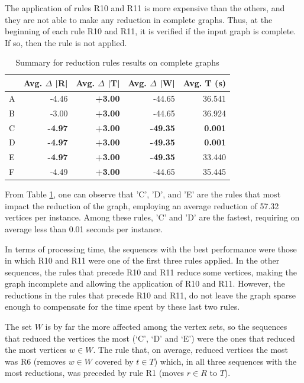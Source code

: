 \documentclass{singlecol-new}
\theoremstyle{TH}{
\newtheorem{lemma}{Lemma}
\newtheorem{theorem}[lemma]{Theorem}
\newtheorem{corrolary}[lemma]{Corrolary}
\newtheorem{conjecture}[lemma]{Conjecture}
\newtheorem{proposition}[lemma]{Proposition}
\newtheorem{claim}[lemma]{Claim}
\newtheorem{stheorem}[lemma]{Wrong Theorem}
}
\theoremstyle{THrm}{
\newtheorem{definition}{Definition}[section]
\newtheorem{question}{Question}[section]
\newtheorem{remark}{Remark}
\newtheorem{scheme}{Scheme}
}
\theoremstyle{THhit}{
\newtheorem{case}{Case}[section]
}
\begin{document}
The application of rules R10 and R11 is more expensive than the others, and they are not able to make any reduction in complete graphs. Thus, at the beginning of each rule R10 and R11, it is verified if the input graph is complete. If so, then the rule is not applied. 


\begin{table}[!h]
	\centering
	\caption{Summary for reduction rules results on complete graphs}
	\label{tab:sum-rr-complete}
	{\footnotesize
	\begin{tabular}{lrrrr}
		\hline
		 & Avg. $\Delta$ |R|     & Avg. $\Delta$ |T|     & Avg. $\Delta$ |W|      & Avg. T (s)     \\
		\hline
		A        & -4.46          & \textbf{+3.00} & -44.65          & 36.541         \\
		B        & -3.00          & \textbf{+3.00} & -44.65          & 36.924         \\
		C        & \textbf{-4.97} & \textbf{+3.00} & \textbf{-49.35} & \textbf{0.001} \\
		D        & \textbf{-4.97} & \textbf{+3.00} & \textbf{-49.35} & \textbf{0.001} \\
		E        & \textbf{-4.97} & \textbf{+3.00} & \textbf{-49.35} & 33.440         \\
		F        & -4.49          & \textbf{+3.00} & -44.65          & 35.445       \\
		\hline 
	\end{tabular}
}
\end{table}

From Table \ref{tab:sum-rr-complete}, one can observe that 'C', 'D', and 'E' are the rules that most impact the reduction of the graph, employing an average reduction of 57.32 vertices per instance. Among these rules, 'C' and 'D' are the fastest, requiring on average less than 0.01 seconds per instance.

In terms of processing time, the sequences with the best performance were those in which R10 and R11 were one of the first three rules applied. In the other sequences, the rules that precede R10 and R11 reduce some vertices, making the graph incomplete and allowing the application of R10 and R11. However, the reductions in the rules that precede R10 and R11, do not leave the graph sparse enough to compensate for the time spent by these last two rules.

The set $ W $ is by far the more affected among the vertex sets, so the sequences that reduced the vertices the most (`C', `D' and `E') were the ones that reduced the most vertices $ w \in W $. The rule that, on average, reduced vertices the most was R6 (removes $ w \in W $ covered by $ t \in T $) which, in all three sequences with the most reductions, was preceded by rule R1 (moves $ r \in R $ to $ T $).
\end{document}
